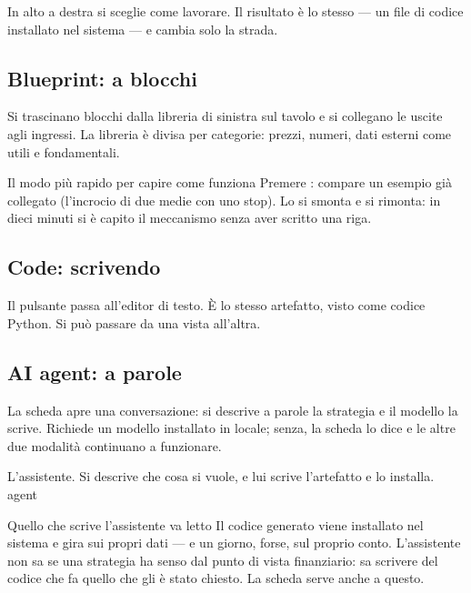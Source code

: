 In alto a destra si sceglie come lavorare. Il risultato è lo stesso --- un
file di codice installato nel sistema --- e cambia solo la strada.

\subsection{Blueprint: a blocchi}

Si trascinano blocchi dalla libreria di sinistra sul tavolo e si collegano le
uscite agli ingressi. La libreria è divisa per categorie: prezzi, numeri,
dati esterni come utili e fondamentali.

\begin{pratica}{Il modo più rapido per capire come funziona}
Premere : compare un esempio già collegato
(l'incrocio di due medie con uno stop). Lo si smonta e si rimonta: in dieci
minuti si è capito il meccanismo senza aver scritto una riga.
\end{pratica}

\subsection{Code: scrivendo}

Il pulsante  passa all'editor di testo. È lo stesso
artefatto, visto come codice Python. Si può passare da una vista all'altra.

\subsection{AI agent: a parole}

La scheda  apre una conversazione: si descrive a parole la
strategia e il modello la scrive. Richiede un modello installato in locale;
senza, la scheda lo dice e le altre due modalità continuano a funzionare.

  {L'assistente. Si descrive che cosa si vuole, e lui scrive l'artefatto e lo
   installa.}
  {agent}

\begin{attenzione}{Quello che scrive l'assistente va letto}
Il codice generato viene installato nel sistema e gira sui propri dati --- e
un giorno, forse, sul proprio conto. L'assistente non sa se una strategia ha
senso dal punto di vista finanziario: sa scrivere del codice che fa quello
che gli è stato chiesto. La scheda  serve anche a questo.
\end{attenzione}

